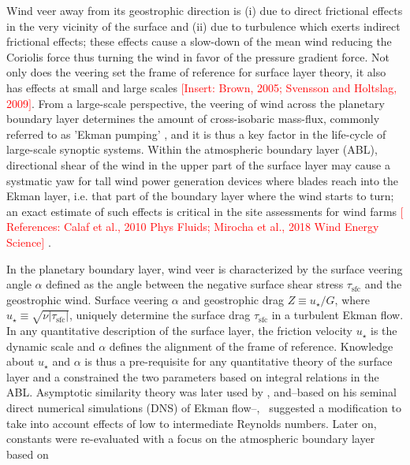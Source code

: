 \documentclass[a4paper,11pt]{amsart}
\newcommand{\todo}[1]{\textcolor{red}{$[$#1$]$}}
\newcommand{\SFC}{\mathrm{sfc}}
\begin{document}
Wind veer away from its geostrophic direction is
(i) due to direct frictional effects in the very vicinity of the surface and
(ii) due to turbulence which exerts indirect frictional effects; these effects
cause a slow-down of the mean wind reducing the Coriolis force thus turning the wind
in favor of the pressure gradient force. 
Not only does the veering set the frame of reference for surface layer theory, it also has
effects at small and large scales \todo{Insert: Brown, 2005; Svensson and Holtslag, 2009}.
%
From a large-scale perspective, the veering of wind across the planetary boundary layer determines
the amount of cross-isobaric mass-flux, commonly referred to as 'Ekman pumping' \citep{ekman:AMA1905},
and it is thus a key factor in the life-cycle of large-scale synoptic systems.
%
% 
Within the atmospheric boundary layer (ABL), directional shear of the wind in
the upper part of the surface layer may cause a systmatic yaw for tall wind power generation devices
where blades reach into the Ekman layer, i.e. that part of the boundary layer where the wind starts to turn;
an exact estimate of such effects is critical in the site assessments for wind farms
\todo{References: Calaf et al., 2010 Phys Fluids; Mirocha et al., 2018 Wind Energy Science} . 
%
\par
%
In the planetary boundary layer, wind veer is characterized by the surface veering angle $\alpha$
defined as the angle between the negative surface shear stress $\tau_\SFC$ and the geostrophic wind.
%
Surface veering $\alpha$ and geostrophic drag $Z\equiv u_\star/G$, where $u_\star\equiv\sqrt{\nu|\tau_\SFC|}$,
uniquely determine the surface drag $\tau_\SFC$ in a turbulent Ekman flow. 
%
In any quantitative description of the surface layer, the friction velocity $u_\star$ is the dynamic scale
and $\alpha$ defines the alignment of the frame of reference.
%
Knowledge about $u_\star$ and $\alpha$ is thus a pre-requisite for any quantitative theory of the surface layer
and a \citet{rossby:PPO1935} constrained the two parameters based on integral relations in the ABL.
%
Asymptotic similarity theory was later used by \citet{tennekes:JAS1973, blackadar:JAS1968},
and--based on his seminal direct numerical simulations (DNS) of Ekman flow--,~\cite{spalart:JFM1989} suggested
a modification to take into account effects of low to intermediate Reynolds numbers.
Later on, constants were re-evaluated with a focus on the atmospheric boundary layer based on
\end{document}

